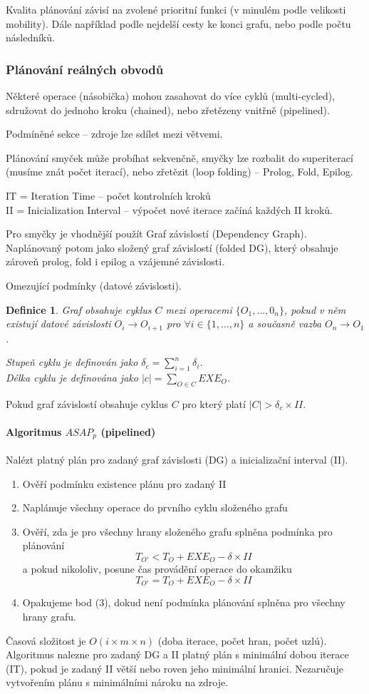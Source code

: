 \documentclass[a4paper, 11pt]{report}
\newtheorem{mydef}{Definice}[chapter]
\begin{document}
Kvalita plánování závisí na zvolené prioritní funkci (v minulém podle velikosti mobility). Dále například podle nejdelší cesty ke konci grafu, nebo podle počtu následníků.

\subsubsection{Plánování reálných obvodů}
Některé operace (násobička) mohou zasahovat do více cyklů (multi-cycled), sdružovat do jednoho kroku (chained), nebo zřetězeny vnitřně (pipelined).

Podmíněné sekce -- zdroje lze sdílet mezi větvemi.

Plánování smyček může probíhat sekvenčně, smyčky lze rozbalit do superiterací (musíme znát počet iterací), nebo zřetězit (loop folding) -- Prolog, Fold, Epilog.

IT = Iteration Time -- počet kontrolních kroků\\
II = Inicialization Interval -- výpočet nové iterace začíná každých II kroků.

Pro smyčky je vhodnější použít Graf závislostí (Dependency Graph).
Naplánovaný potom jako složený graf závislostí (folded DG), který obsahuje zároveň prolog, fold i epilog a vzájemné závislosti.

Omezující podmínky (datové závislosti).

\begin{mydef}
Graf obsahuje cyklus $C$ mezi operacemi $\{O_1, \dots, 0_n\}$, pokud v něm existují datové závislosti $O_i \to O_{i+1}$ pro $\forall i \in \{1, \dots, n\}$ a současně vazba $O_n \to O_1$.

Stupeň cyklu je definován jako $\delta_c = \sum_{i=1}^n \delta_i$.\\
Délka cyklu je definována jako $|c| = \sum_{O \in C} EXE_O$.
\end{mydef}
Pokud graf závislostí obsahuje cyklus $C$ pro který platí $|C| > \delta_c \times II$.

\paragraph{Algoritmus $ASAP_p$ (pipelined)}
Nalézt platný plán pro zadaný graf závislosti (DG) a inicializační interval (II).
\begin{enumerate}
	\item Ověří podmínku existence plánu pro zadaný II
	\item Naplánuje všechny operace do prvního cyklu složeného grafu
	\item Ověří, zda je pro všechny hrany složeného grafu splněna podmínka pro plánování
	$$T_{O'} < T_O + EXE_O - \delta \times II$$
	a pokud nikololiv, posune čas provádění operace do okamžiku 
	$$T_{O'} = T_O + EXE_O - \delta \times II$$
	\item Opakujeme bod (3), dokud není podmínka plánování splněna pro všechny hrany grafu.
\end{enumerate}
Časová složitost je $O(i \times m \times n)$ (doba iterace, počet hran, počet uzlú). Algoritmus nalezne pro zadaný DG a II platný plán s minimální dobou iterace (IT), pokud je zadaný II větší nebo roven jeho minimální hranici.
Nezaručuje vytvořením plánu s minimálními nároku na zdroje.
\end{document}
